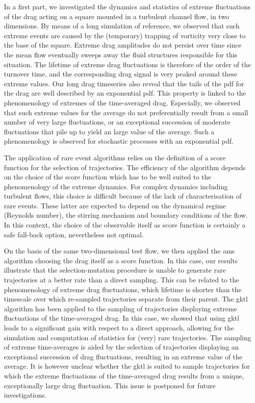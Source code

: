 \documentclass{jfm}
\begin{document}
In a first part, we investigated the dynamics and statistics of extreme fluctuations of the drag acting on a square mounted in a turbulent channel flow, in two dimensions.
By means of a long simulation of reference, we observed that such extreme events are caused by the (temporary) trapping of vorticity very close to the base of the square.
Extreme drag amplitudes do not persist over time since the mean flow eventually sweeps away the fluid structures responsible for this situation.
%
The lifetime of extreme drag fluctuations is therefore of the order of the turnover time, and the corresponding drag signal is very peaked around these extreme values.
Our long drag timeseries also reveal that the tails of the \ac{pdf} for the drag are well described by an exponential \ac{pdf}.
This property is linked to the phenomenology of extremes of the time-averaged drag.
Especially, we observed that such extreme values for the average do not preferentially result from a small number of very large fluctuations, or an exceptional succession of moderate fluctuations that pile up to yield an large value of the average.
Such a phenomenology is observed for stochastic processes with an exponential \ac{pdf}.

The application of rare event algorithms relies on the definition of a score function for the selection of trajectories.
The efficiency of the algorithm depends on the choice of the score function which has to be well suited to the phenomenology of the extreme dynamics.
For complex dynamics including turbulent flows, this choice is  difficult because of the lack of characterisation of rare events. These latter are expected to depend on the dynamical regime (Reynolds number), the stirring mechanism and boundary conditions of the flow. In this context, the choice of the observable itself as score function is certainly a safe fall-back option, nevertheless not optimal.

On the basis of the same two-dimensional test flow, we then applied the \ac{ams} algorithm choosing the drag itself as a score function.
In this case, our results illustrate that the selection-mutation procedure is unable to generate rare trajectories at a better rate than a direct sampling.
This can be related to the phenomenology of extreme drag fluctuations, which lifetime is shorter than the timescale over which re-sampled trajectories separate from their parent. 
The \ac{gktl} algorithm has been applied to the sampling of trajectories displaying extreme fluctuations of the time-averaged drag.
In this case, we showed that using \ac{gktl} leads to a significant gain with respect to a direct approach, allowing for the simulation and computation of statistics for (very) rare trajectories.
The sampling of extreme time-averages is aided by the selection of trajectories displaying an exceptional succession of drag fluctuations, resulting in an extreme value of the average.
It is however unclear whether the \ac{gktl} is suited to sample trajectories for which the extreme fluctuations of the time-averaged drag results from a unique, exceptionally large drag fluctuation. This issue is postponed for future investigations.
\end{document}
